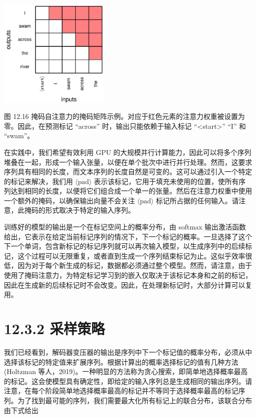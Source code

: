 \documentclass[10pt]{report}
\begin{document}
\begin{center}
\includegraphics[max width=0.4\textwidth]{images/0194e279-9b28-703a-88f4-c3ac21e2010d_404_960_345_591_585_0.jpg}
\end{center}
\hspace*{3em} 

图 12.16 掩码自注意力的掩码矩阵示例。对应于红色元素的注意力权重被设置为零。因此，在预测标记 “across” 时，输出只能依赖于输入标记 “<start>” “I” 和 “swam”。

在实践中，我们希望有效利用 GPU 的大规模并行计算能力，因此可以将多个序列堆叠在一起，形成一个输入张量，以便在单个批次中进行并行处理。然而，这要求序列具有相同的长度，而文本序列的长度自然是可变的。这可以通过引入一个特定的标记来解决，我们用 \(\langle \mathrm{{pad}}\rangle\) 表示该标记，它用于填充未使用的位置，使所有序列达到相同的长度，以便将它们组合成一个单一的张量。然后在注意力权重中使用一个额外的掩码，以确保输出向量不会关注 \(\langle \mathrm{{pad}}\rangle\) 标记所占据的任何输入。请注意，此掩码的形式取决于特定的输入序列。

训练好的模型的输出是一个在标记空间上的概率分布，由 softmax 输出激活函数给出，它表示在给定当前标记序列的情况下，下一个标记的概率。一旦选择了这个下一个单词，包含新标记的标记序列就可以再次输入模型，以生成序列中的后续标记，这个过程可以无限重复，或者直到生成一个序列结束标记为止。这似乎效率很低，因为对于每个新生成的标记，数据都必须通过整个模型。然而，请注意，由于使用了掩码注意力，为特定标记学习到的嵌入仅取决于该标记本身和之前的标记，因此在生成新的后续标记时不会改变。因此，在处理新标记时，大部分计算可以复用。

\section*{12.3.2 采样策略}

我们已经看到，解码器变压器的输出是序列中下一个标记值的概率分布，必须从中选择该标记的特定值来扩展序列。根据计算出的概率选择标记的值有几种方法(Holtzman 等人，2019)。一种明显的方法称为贪心搜索，即简单地选择概率最高的标记。这会使模型具有确定性，即给定的输入序列总是生成相同的输出序列。请注意，在每个阶段简单地选择概率最高的标记并不等同于选择概率最高的标记序列。为了找到最可能的序列，我们需要最大化所有标记上的联合分布，该联合分布由下式给出
\end{document}
